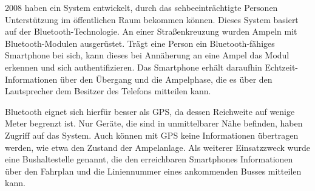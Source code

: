 2008 haben \textcite{Bohonos:2008:Cellphone-Accessible-Information} ein System entwickelt, durch das sehbeeinträchtigte Personen Unterstützung im öffentlichen Raum bekommen können. Dieses System basiert auf der Bluetooth-Technologie. An einer Straßenkreuzung wurden Ampeln mit Bluetooth-Modulen ausgerüstet. Trägt eine Person ein Bluetooth-fähiges Smartphone bei sich, kann dieses bei Annäherung an eine Ampel das Modul erkennen und sich authentifizieren. Das Smartphone erhält daraufhin Echtzeit-Informationen über den Übergang und die Ampelphase, die es über den Lautsprecher dem Besitzer des Telefons mitteilen kann.

Bluetooth eignet sich hierfür besser als GPS, da dessen Reichweite auf wenige Meter begrenzt ist. Nur Geräte, die sind in unmittelbarer Nähe befinden, haben Zugriff auf das System. Auch können mit GPS keine Informationen übertragen werden, wie etwa den Zustand der Ampelanlage. Als weiterer Einsatzzweck wurde eine Bushaltestelle genannt, die den erreichbaren Smartphones Informationen über den Fahrplan und die Liniennummer eines ankommenden Busses mitteilen kann.
